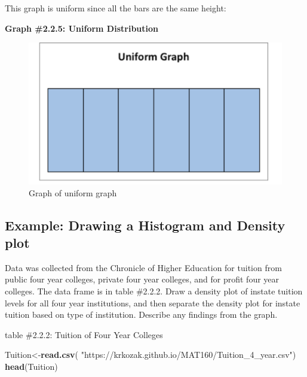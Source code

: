 \documentclass[
]{book}
\newenvironment{Shaded}{\begin{snugshade}}{\end{snugshade}}
\newcommand{\KeywordTok}[1]{\textcolor[rgb]{0.13,0.29,0.53}{\textbf{#1}}}
\newcommand{\NormalTok}[1]{#1}
\newcommand{\StringTok}[1]{\textcolor[rgb]{0.31,0.60,0.02}{#1}}
\begin{document}
This graph is uniform since all the bars are the same height:

\textbf{Graph \#2.2.5: Uniform Distribution}

\begin{figure}
\centering
\includegraphics{uniform.png}
\caption{Graph of uniform graph}
\end{figure}

\hypertarget{example-drawing-a-histogram-and-density-plot-1}{%
\subsection{Example: Drawing a Histogram and Density plot}\label{example-drawing-a-histogram-and-density-plot-1}}

Data was collected from the Chronicle of Higher Education for tuition from public four year colleges, private four year colleges, and for profit four year colleges. The data frame is in table \#2.2.2. Draw a density plot of instate tuition levels for all four year institutions, and then separate the density plot for instate tuition based on type of institution. Describe any findings from the graph.

table \#2.2.2: Tuition of Four Year Colleges

\begin{Shaded}
\begin{Highlighting}[]
\NormalTok{Tuition<-}\KeywordTok{read.csv}\NormalTok{(}
  \StringTok{"https://krkozak.github.io/MAT160/Tuition_4_year.csv"}\NormalTok{)}
\KeywordTok{head}\NormalTok{(Tuition)}
\end{Highlighting}
\end{Shaded}
\end{document}
